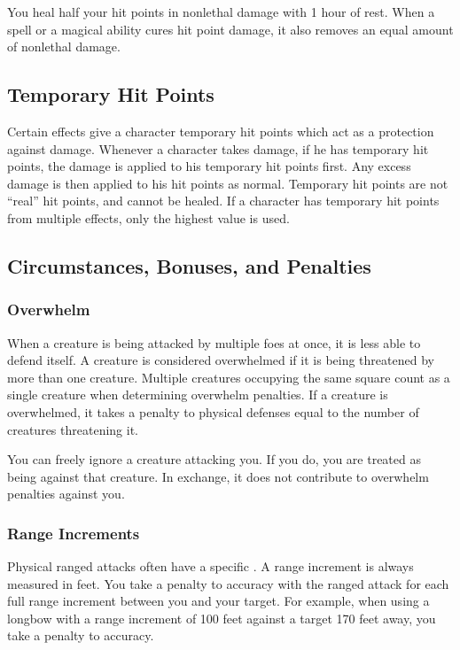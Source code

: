             You heal half your hit points in nonlethal damage with 1 hour of rest.
            When a spell or a magical ability cures hit point damage, it also removes an equal amount of nonlethal damage.

    \subsection{Temporary Hit Points}\label{Temporary Hit Points}
        Certain effects give a character temporary hit points which act as a protection against damage.
        Whenever a character takes damage, if he has temporary hit points, the damage is applied to his temporary hit points first.
        Any excess damage is then applied to his hit points as normal.
        Temporary hit points are not ``real'' hit points, and cannot be healed.
        If a character has temporary hit points from multiple effects, only the highest value is used.

    \subsection{Circumstances, Bonuses, and Penalties}

        \subsubsection{Overwhelm}\label{Overwhelm}
            When a creature is being attacked by multiple foes at once, it is less able to defend itself.
            A creature is considered overwhelmed if it is being threatened by more than one creature.
            Multiple creatures occupying the same square count as a single creature when determining overwhelm penalties.
            If a creature is overwhelmed, it takes a penalty to physical defenses equal to the number of creatures threatening it.

             You can freely ignore a creature attacking you.
            If you do, you are treated as being \unaware against that creature.
            In exchange, it does not contribute to overwhelm penalties against you.

        \subsubsection{Range Increments}\label{Range Increments}
            Physical ranged attacks often have a specific .
            A range increment is always measured in feet.
            You take a  penalty to accuracy with the ranged attack for each full range increment between you and your target.
            For example, when using a longbow with a range increment of 100 feet against a target 170 feet away, you take a  penalty to accuracy.

